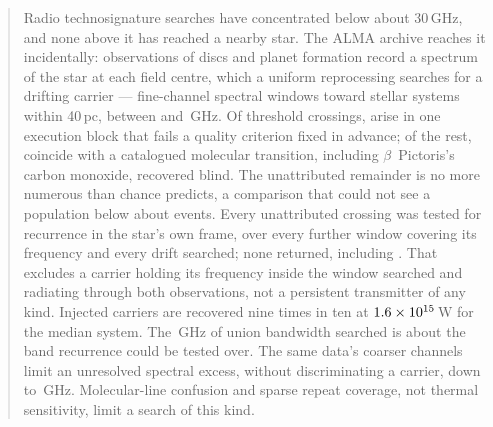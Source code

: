 \begin{abstract}
Radio technosignature searches have concentrated below about 30\,GHz, and
none above it has reached a nearby star. The ALMA
archive reaches it incidentally: observations of discs and planet formation
record a spectrum of the star at each field centre, which a uniform
reprocessing searches for a drifting carrier --- \NWinA{}
fine-channel spectral windows toward \NSysClassA{} stellar systems within
40\,pc, between \SurvFreqLoA{} and \SurvFreqHiA\,GHz. Of \EvNCrossRaw{}
threshold crossings, \PrFlagXrossWord{} arise in one execution block that
fails a quality criterion fixed in advance; of the rest, \EvNAttrQp{}
coincide with a catalogued molecular transition, including $\beta$~Pictoris's
carbon monoxide, recovered blind. The unattributed remainder is no more
numerous than chance predicts, a comparison that could not see a
population below about \StFloor{} events. Every unattributed crossing was
tested for recurrence in the star's own frame, over every further window
covering its frequency and every drift searched; none returned, including
\PrRankClause. That excludes a carrier holding its frequency inside the
window searched and radiating through both observations, not a persistent
transmitter of any kind. Injected carriers are recovered nine times in ten
at $\EirpNinetySysMedA$\,W for the median system. The \CvUnionA\,GHz of
union bandwidth searched is about \PrConfFactor{} the band recurrence could
be tested over. The same data's coarser channels limit an unresolved
spectral excess, without discriminating a carrier, down to
\SurvFreqLo\,GHz. Molecular-line confusion and sparse repeat coverage, not
thermal sensitivity, limit a search of this kind.
\end{abstract}



